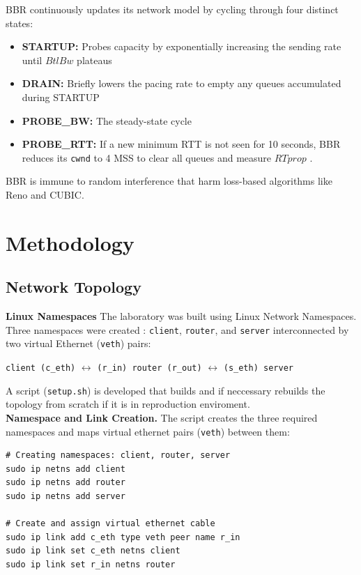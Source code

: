 \documentclass[12pt,a4paper]{article}
\begin{document}
\begin{itemize}
    BBR continuously updates its network model by cycling through four distinct states:
    \begin{itemize}
        \item \textbf{STARTUP:} Probes capacity by exponentially increasing the sending rate until $BtlBw$ plateaus
        \item \textbf{DRAIN:} Briefly lowers the pacing rate to empty any queues accumulated during STARTUP
        \item \textbf{PROBE\_BW:} The steady-state cycle
        \item \textbf{PROBE\_RTT:} If a new minimum RTT is not seen for 10 seconds, BBR  reduces its \texttt{cwnd} to 4 MSS to clear all queues and measure $RTprop$ \cite{cardwell2023bbr}.
    \end{itemize}
    BBR is  immune to random  interference that harm loss-based algorithms like Reno and CUBIC.
\end{itemize}

\section{Methodology}

\subsection{Network Topology}

\textbf{Linux Namespaces}
The laboratory was built using Linux Network Namespaces. Three namespaces were created : \texttt{client}, \texttt{router}, and \texttt{server} interconnected by two virtual Ethernet (\texttt{veth}) pairs:

\begin{center}
\texttt{client (c\_eth)} $\longleftrightarrow$ \texttt{(r\_in) router (r\_out)} $\longleftrightarrow$ \texttt{(s\_eth) server}
\end{center}

A script (\texttt{setup.sh}) is developed that builds and if neccessary rebuilds the topology from scratch if it is in reproduction enviroment.\\
\textbf{Namespace and Link Creation.} The script creates the three required namespaces and maps virtual ethernet pairs (\texttt{veth}) between them:

\begin{verbatim}
# Creating namespaces: client, router, server
sudo ip netns add client
sudo ip netns add router
sudo ip netns add server

# Create and assign virtual ethernet cable 
sudo ip link add c_eth type veth peer name r_in
sudo ip link set c_eth netns client
sudo ip link set r_in netns router
\end{verbatim}
\end{document}
